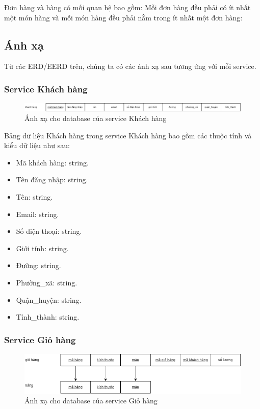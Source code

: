 Đơn hàng và hàng có mối quan hệ bao gồm: Mỗi đơn hàng đều phải có ít nhất một món hàng và mỗi món hàng đều phải nằm trong ít nhất một đơn hàng:


\subsection{Ánh xạ}
\par Từ các ERD/EERD trên, chúng ta có các ánh xạ sau tương ứng với mỗi service.

\subsubsection{Service Khách hàng}
\begin{figure}[!htp]
    \begin{center}
        \includegraphics[width=1\textwidth]{img/database/mapping/mapping-customer.png}
        \newline
        \caption{Ánh xạ cho database của service Khách hàng}
    \end{center}
\end{figure}

Bảng dữ liệu Khách hàng trong service Khách hàng bao gồm các thuộc tính và kiểu dữ liệu như sau:
\begin{itemize}
    \item Mã khách hàng: string.
    \item Tên đăng nhập: string.
    \item Tên: string.
    \item Email: string.
    \item Số điện thoại: string.
    \item Giới tính: string.
    \item Đường: string.
    \item Phường\_xã: string.
    \item Quận\_huyện: string.
    \item Tỉnh\_thành: string.
\end{itemize}

\subsubsection{Service Giỏ hàng}
\begin{figure}[!htp]
    \begin{center}
        \includegraphics[width=1\textwidth]{img/database/mapping/mapping-cart.png}
        \newline
        \caption{Ánh xạ cho database của service Giỏ hàng}
    \end{center}
\end{figure}

